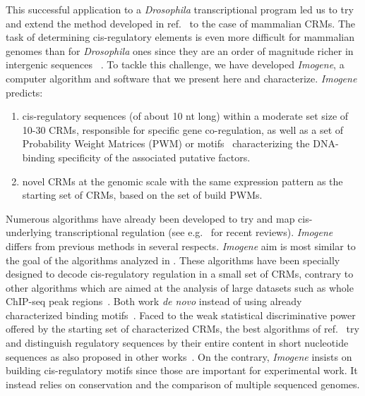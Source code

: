 \documentclass[a4,center,fleqn]{NAR}
\begin{document}
This successful application  to a {\em Drosophila} transcriptional program led
us to try and extend the  method developed in ref.~\cite{Rouault:2010fk}
to the case of mammalian CRMs.
The task of determining cis-regulatory elements is even more difficult for
mammalian genomes  than for  {\em Drosophila} ones since they  are an order of
magnitude richer in intergenic sequences
~\cite{Flicek2012fk,clark2007evolution}.
To tackle this challenge, we have developed {\em Imogene}, a computer algorithm
and software that we present here and characterize.
{\em Imogene} predicts:
\begin{enumerate}
\item  cis-regulatory sequences (of about 10 nt long) within a moderate set
  size  of 10-30 CRMs, responsible for specific gene co-regulation, as well as
  a set of Probability Weight Matrices (PWM) or
  motifs~\cite{pmid15131651,stormo1998specificity} characterizing the
  DNA-binding specificity of the associated putative factors.
\item novel CRMs at the genomic scale with the same expression pattern as the
  starting set of CRMs, based on the set of build PWMs.
\end{enumerate}

Numerous algorithms have already been developed to try and map cis- underlying
transcriptional regulation (see
e.g.~\cite{pmid22705667,pmid21152003,pmid17053094,pmid15131651,pmid22305161}
for recent reviews).
{\em Imogene} differs from previous methods in several respects.
{\em Imogene} aim is most similar to the goal of the algorithms analyzed in
\cite{kantorovitz2009motif}. 
These algorithms have been specially designed to decode cis-regulatory
regulation in a small set of CRMs,  contrary to  other algorithms which are
aimed at the analysis of large datasets such as whole ChIP-seq peak
regions~\cite{pmid21486936}.
Both work {\em de novo} instead of using already characterized binding
motifs~\cite{berman2002exploiting, halfon2002computation,
  rebeiz2002score,schroeder2004transcriptional, Moses:2004vn,
  siddharthan2005phylogibbs, hallikas2006genome, pierstorff2006identifying,
Herrmann2012uq}.
Faced to the weak statistical discriminative power offered by the starting set
of characterized CRMs, the best algorithms of ref.~\cite{kantorovitz2009motif}
try and distinguish regulatory sequences by their entire content in short
nucleotide sequences as also proposed in other
works~\cite{nazina2003statistical, abnizova2005some, chan2005using,
leung2009identifying, Brody:2012pd}.
On the contrary, {\em Imogene} insists on building cis-regulatory motifs since
those are important for  experimental work.
It instead relies on conservation and the comparison of multiple sequenced
genomes.
\end{document}

